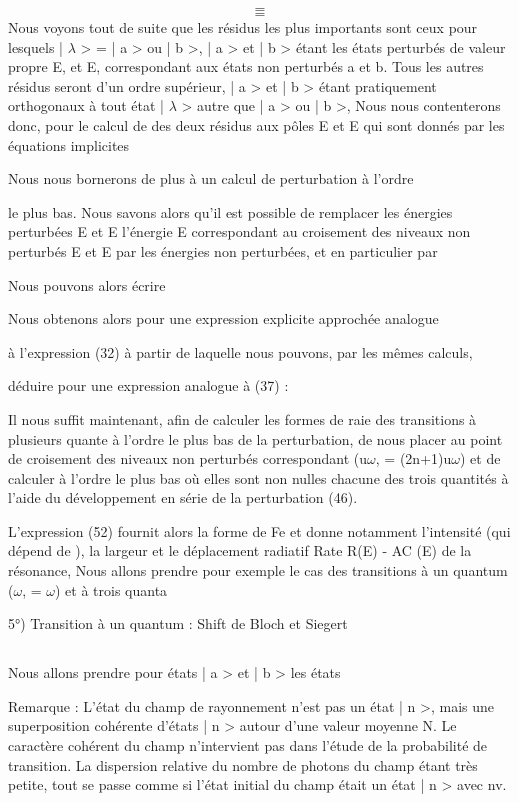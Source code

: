 
\[
\tag{51}=
\]
\[
\tag{52}=
\]
Nous voyons tout de suite que les résidus les plus importants sont ceux pour
lesquels | $\lambda$ > = | a > ou | b >, | a > et | b > étant les états perturbés de
valeur propre E, et E, correspondant aux états non perturbés a et b. Tous
les autres résidus seront d'un ordre supérieur, | a > et | b > étant pratiquement
orthogonaux à tout état | $\lambda$ > autre que | a > ou | b >, Nous nous contenterons donc,
pour le calcul de  des deux résidus aux pôles E et E
qui sont donnés par les équations implicites

Nous nous bornerons de plus à un calcul de perturbation à l'ordre

le plus bas. Nous savons alors qu'il est possible de remplacer les énergies
perturbées E et E
l'énergie E correspondant au croisement des niveaux non perturbés E et E
par les énergies non perturbées, et en particulier par

Nous pouvons alors écrire

Nous obtenons alors pour  une expression explicite approchée analogue

à l'expression (32) à partir de laquelle nous pouvons, par les mêmes calculs,

déduire pour  une expression analogue à (37) :

Il nous suffit maintenant, afin de calculer les formes de raie des transitions
à plusieurs quante à l'ordre le plus bas de la perturbation, de nous placer au
point de croisement des niveaux non perturbés correspondant (u$\omega$, = (2n+1)u$\omega$) et
de calculer à l'ordre le plus bas où elles sont non nulles chacune des trois
quantités  à l'aide du développement en série de la perturbation (46).

L'expression (52) fournit alors la forme de Fe et donne notamment l'intensité (qui dépend de ),
la largeur  et le déplacement radiatif Rate R(E) - AC (E) de la résonance, Nous allons prendre pour
exemple le cas des transitions à un quantum ($\omega$, = $\omega$) et à trois quanta

5°) Transition à un quantum : Shift de Bloch et Siegert
\subsection{}%
Nous allons prendre pour états | a > et | b > les états

Remarque : L'état du champ de rayonnement n'est pas un état | n >, mais une superposition
cohérente d'états | n > autour d'une valeur moyenne N. Le caractère
cohérent du champ n'intervient pas dans l'étude de la probabilité de transition.
La dispersion relative du nombre de photons du champ  étant très
petite, tout se passe comme si l'état initial du champ était un état | n >
avec nv.

